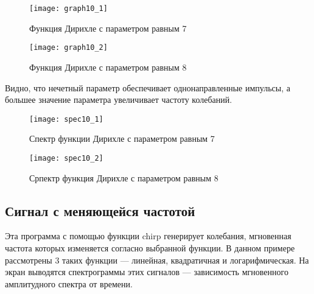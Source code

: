 \begin{figure}[H]
	\begin{center}
		\texttt{[image: graph10\_1]}
		\caption{Функция Дирихле с параметром равным 7} 
		\label{pic:graph10_1} %
	\end{center}
\end{figure}
\begin{figure}[H]
	\begin{center}
		\texttt{[image: graph10\_2]}
		\caption{Функция Дирихле с параметром равным 8} 
		\label{pic:graph10_2} %
	\end{center}
\end{figure}
Видно, что нечетный параметр обеспечивает однонаправленные импульсы, а большее значение параметра увеличивает частоту колебаний.

\begin{figure}[H]
	\begin{center}
		\texttt{[image: spec10\_1]}
		\caption{Спектр функции Дирихле с параметром равным 7} 
		\label{pic:spec10_1} %
	\end{center}
\end{figure}
\begin{figure}[H]
	\begin{center}
		\texttt{[image: spec10\_2]}
		\caption{Српектр функция Дирихле с параметром равным 8} 
		\label{pic:spec10_2} %
	\end{center}
\end{figure}

\subsection{Сигнал с меняющейся частотой}


\parindent=1cm
Эта программа с помощью функции chirp генерирует колебания, мгновенная частота которых изменяется согласно выбранной функции. В данном примере рассмотрены 3 таких функции — линейная, квадратичная и логарифмическая. На экран выводятся спектрограммы этих сигналов — зависимость мгновенного амплитудного спектра от времени.

